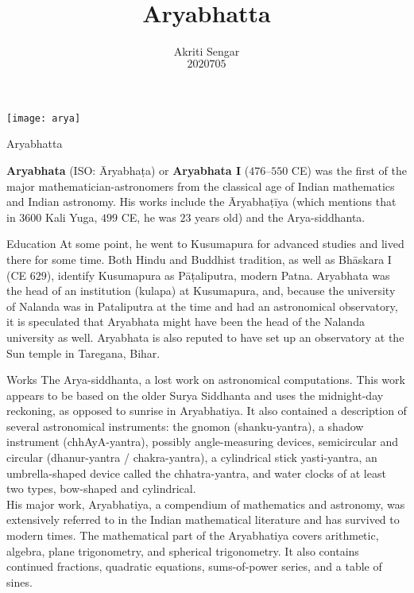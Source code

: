 \documentclass{beamer}
\author{Akriti Sengar \\ $2020705$}
\title{\textbf{Aryabhatta}}
\institute{Shaheed Rajguru College of Applied Sciences for Women \\ University of Delhi, Delhi:- $110096$, India}
\begin{document}
	\maketitle
	\begin{frame}
		\begin{center}
\texttt{[image: arya]}
		\end{center}
	\end{frame}
	
	\begin{frame}{Aryabhatta}
		\begin{block}{}
		\textbf{Aryabhata} (ISO: Āryabhaṭa) or \textbf{Aryabhata I} ($476–550$ CE) was the first of the major mathematician-astronomers from the classical age of Indian mathematics and Indian astronomy. \pause His works include the Āryabhaṭīya (which mentions that in $3600$ Kali Yuga, $499$ CE, he was $23$ years old) and the Arya-siddhanta.
		\end{block}
	\end{frame}

\begin{frame}
\begin{block}{Education}
	At some point, he went to Kusumapura for advanced studies and lived there for some time. \pause Both Hindu and Buddhist tradition, as well as Bhāskara I (CE $629$), identify Kusumapura as Pāṭaliputra, modern Patna. \pause Aryabhata was the head of an institution (kulapa) at Kusumapura, and, because the university of Nalanda was in Pataliputra at the time and had an astronomical observatory, it is speculated that Aryabhata might have been the head of the Nalanda university as well. \pause Aryabhata is also reputed to have set up an observatory at the Sun temple in Taregana, Bihar.
\end{block}
\end{frame}

\begin{frame}
	\begin{block}{Works}
				The Arya-siddhanta, a lost work on astronomical computations. \pause This work appears to be based on the older Surya Siddhanta and uses the midnight-day reckoning, as opposed to sunrise in Aryabhatiya. \pause It also contained a description of several astronomical instruments: the gnomon (shanku-yantra), a shadow instrument (chhAyA-yantra), possibly angle-measuring devices, semicircular and circular (dhanur-yantra / chakra-yantra), a cylindrical stick yasti-yantra, an umbrella-shaped device called the chhatra-yantra, and water clocks of at least two types, bow-shaped and cylindrical. \pause \\
		His major work, Aryabhatiya, a compendium of mathematics and astronomy, was extensively referred to in the Indian mathematical literature and has survived to modern times. \pause The mathematical part of the Aryabhatiya covers arithmetic, algebra, plane trigonometry, and spherical trigonometry. It also contains continued fractions, quadratic equations, sums-of-power series, and a table of sines.
	\end{block}
\end{frame}
\end{document}
